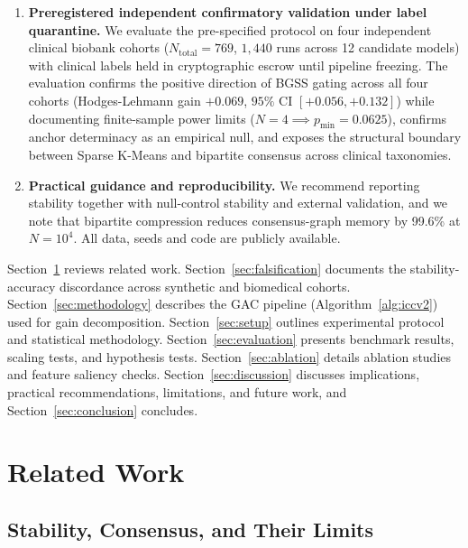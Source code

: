 \documentclass[pdflatex,sn-mathphys-num]{sn-jnl}
\theoremstyle{thmstyleone}
\theoremstyle{thmstyletwo}
\theoremstyle{thmstylethree}
\begin{document}
\begin{enumerate}
 \item \textbf{Preregistered independent confirmatory validation under label quarantine.} We evaluate the pre-specified protocol on four independent clinical biobank cohorts ($N_{\text{total}}=769$, $1{,}440$ runs across 12 candidate models) with clinical labels held in cryptographic escrow until pipeline freezing. The evaluation confirms the positive direction of BGSS gating across all four cohorts (Hodges-Lehmann gain $+0.069$, $95\%$ CI $[+0.056, +0.132]$) while documenting finite-sample power limits ($N=4 \implies p_{\min} = 0.0625$), confirms anchor determinacy as an empirical null, and exposes the structural boundary between Sparse K-Means and bipartite consensus across clinical taxonomies.

 \item \textbf{Practical guidance and reproducibility.} We recommend reporting stability together with null-control stability and external validation, and we note that bipartite compression reduces consensus-graph memory by 99.6\% at $N = 10^4$. All data, seeds and code are publicly available.
\end{enumerate}

Section~\ref{sec:related} reviews related work. Section~\ref{sec:falsification} documents the stability-accuracy discordance across synthetic and biomedical cohorts. Section~\ref{sec:methodology} describes the GAC pipeline (Algorithm~\ref{alg:iccv2}) used for gain decomposition. Section~\ref{sec:setup} outlines experimental protocol and statistical methodology. Section~\ref{sec:evaluation} presents benchmark results, scaling tests, and hypothesis tests. Section~\ref{sec:ablation} details ablation studies and feature saliency checks. Section~\ref{sec:discussion} discusses implications, practical recommendations, limitations, and future work, and Section~\ref{sec:conclusion} concludes.


\section{Related Work}\label{sec:related}

\subsection{Stability, Consensus, and Their Limits}\label{sec:rel_stability}
\end{document}
